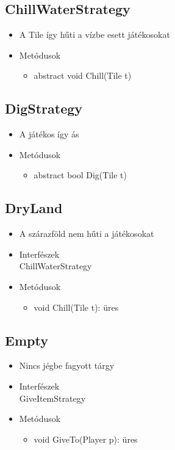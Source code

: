 \subsection{ChillWaterStrategy}
\begin{itemize}
	\item  A Tile így hűti a vízbe esett játékosokat\\
	
\item Metódusok
\begin{itemize}
	\item abstract void Chill(Tile t)
\end{itemize}
\end{itemize}

\subsection{DigStrategy}
\begin{itemize}
	\item A játékos így ás\\
	
\item Metódusok
\begin{itemize}
	\item abstract bool Dig(Tile t)
\end{itemize}
\end{itemize}

\subsection{DryLand}
\begin{itemize}
	\item A szárazföld nem hűti a játékosokat\\
	
\item Interfészek\\
ChillWaterStrategy
\item Metódusok
\begin{itemize}
	\item void Chill(Tile t): üres
\end{itemize}
\end{itemize}

\subsection{Empty}
\begin{itemize}
	\item Nincs jégbe fagyott tárgy\\
	
\item Interfészek\\
GiveItemStrategy
\item Metódusok
\begin{itemize}
	\item void GiveTo(Player p): üres
\end{itemize}
\end{itemize}

